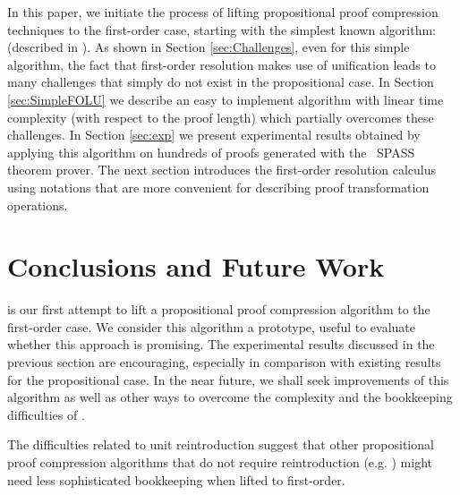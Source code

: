 \documentclass{llncs}
\begin{document}
In this paper, we initiate the process of lifting propositional proof compression techniques to the first-order case, starting with the simplest known algorithm: {\LowerUnits} (described in \cite{LURPI}). 
As shown in Section \ref{sec:Challenges}, even for this simple algorithm, the fact that first-order resolution makes use of unification leads to many challenges that simply do not exist in the propositional case. 
In Section \ref{sec:SimpleFOLU} we describe an easy to implement algorithm with  linear time complexity (with respect to the proof length) which partially overcomes these challenges. 
In Section \ref{sec:exp} we present experimental results obtained by applying this algorithm on hundreds of proofs generated with the{\
SPASS} theorem prover. 
The next section introduces the first-order resolution calculus using notations that are more convenient for describing proof transformation operations.













\section{Conclusions and Future Work}

{\SFOLowerUnits} is our first attempt to lift a propositional proof compression algorithm to the first-order case. We consider this algorithm a prototype, useful to evaluate whether this approach is promising. The experimental results discussed in the previous section are encouraging, especially in comparison with existing results for the propositional case. In the near future, we shall seek improvements of this algorithm as well as other ways to overcome the complexity and the bookkeeping difficulties of {\FOLowerUnits}.

The difficulties related to unit reintroduction suggest that other propositional proof compression algorithms that do not require reintroduction (e.g. {\RecyclePivotsIntersection} \cite{LURPI}) might need less sophisticated bookkeeping when lifted to first-order.
\end{document}
